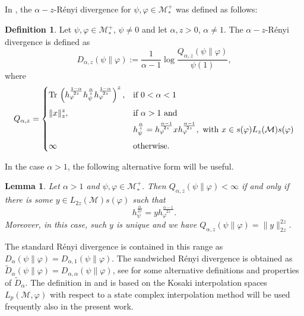 \documentclass[12pt]{article}
\newtheorem{lemma}[theorem]{Lemma}
\theoremstyle{definition}
\newtheorem{defi}[theorem]{Definition}
\theoremstyle{remark}
\numberwithin{equation}{section}
\def\Me{\mathcal M}
\def \Tr{\mathrm{Tr}\,}
\begin{document}
In \cite{kato2023aremark, kato2023onrenyi}, the
$\alpha-z$-R\'enyi divergence for $\psi,\varphi\in \mathcal M_*^+$  was defined as
follows: 
\begin{defi}\label{defi:renyi} Let $\psi,\varphi\in \Me_*^+$, $\psi\ne 0$ and let
$\alpha,z>0$, $\alpha\ne 1$. The $\alpha-z$-R\'enyi divergence is defined as 
\[
D_{\alpha,z}(\psi\|\varphi):=\frac1{\alpha-1}\log
\frac{Q_{\alpha,z}(\psi\|\varphi)}{\psi(1)},
\]
where
\[
Q_{\alpha,z}=\begin{dcases} \Tr
\left(h_\varphi^{\frac{1-\alpha}{2z}}h_\psi^{\frac{\alpha}{z}}h_\varphi^{\frac{1-\alpha}{2z}}\right)^z, &
\text{if } 0<\alpha<1\\[0.3em]
\|x\|_z^z, & \text{if } \alpha>1 \text{ and }\\
\ &
h_\psi^{\frac{\alpha}{z}}=h_\varphi^{\frac{\alpha-1}{2z}}xh_\varphi^{\frac{\alpha-1}{2z}},\text{ with }
x\in s(\varphi)L_z(\Me)s(\varphi)\\[0.3em]
\infty& \text{otherwise}.
\end{dcases}
\]
\end{defi}


In the case $\alpha>1$, the following alternative form will be useful.

\begin{lemma}\cite[Lemma 7]{kato2023onrenyi} \label{lemma:renyi_2z}
Let $\alpha>1$ and $\psi,\varphi\in \Me_*^+$. Then $Q_{\alpha,z}(\psi\|\varphi)<\infty$ if
and only if there is some $y\in L_{2z}(\Me)s(\varphi)$ such that 
\[
h_\psi^{\frac{\alpha}{2z}}=yh_\varphi^{\frac{\alpha-1}{2z}}.
\]
Moreover, in this case, such $y$ is unique and we have
$Q_{\alpha,z}(\psi\|\varphi)=\|y\|_{2z}^{2z}$. 
\end{lemma}

The standard R\'enyi divergence \cite{petz1985quasi, hiai2018quantum, hiai2021quantum} is
contained in this range as $D_\alpha(\psi\|\varphi)=D_{\alpha,1}(\psi\|\varphi)$. The
sandwiched R\'enyi divergence  is obtained as $\tilde
D_\alpha(\psi\|\varphi)=D_{\alpha,\alpha}(\psi\|\varphi)$, see
\cite{berta2018renyi,hiai2021quantum,jencova2018renyi, jencova2021renyi} for some
alternative definitions and properties of $\tilde D_\alpha$. The definition in
\cite{jencova2018renyi} and \cite{jencova2021renyi} is based on the Kosaki interpolation
spaces  $L_p(\Me,\varphi)$ with respect to a state %
complex interpolation method will be used frequently also in the present work. 
\end{document}
